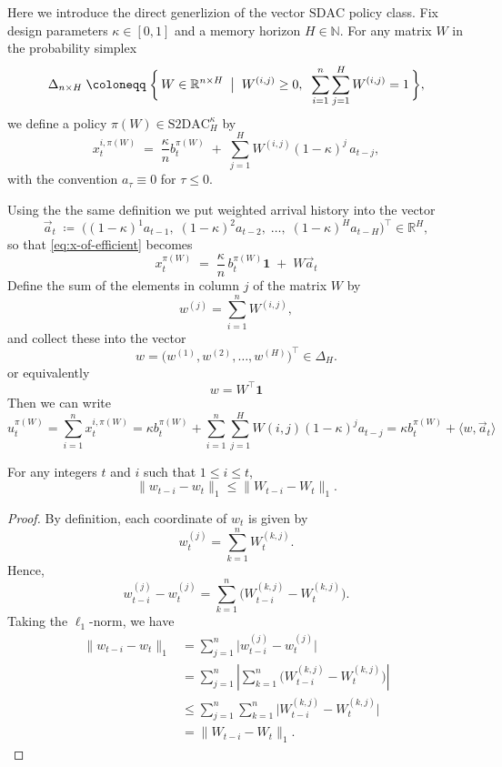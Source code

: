 Here we introduce the direct generlizion of the vector $\mathrm{SDAC}$ policy class.
Fix design parameters \(\kappa \in [0,1]\) and a memory horizon \(H \in \mathbb{N}\).  For any matrix \(W\)  in the probability simplex
\[
\Delta_{n \times H} \;\coloneqq\;
\biggl\{\,W\in\mathbb{R}^{n\times H} \;\bigm|\; W^{(i,j)} \ge 0, \;\; \sum_{i=1}^n\sum_{j=1}^H W^{(i,j)} = 1 \,\biggr\},
\]
we define a policy \(\pi(W) \in \mathrm{S2DAC}_H^\kappa\) by
\begin{equation}\label{eq:x-of-efficient}
x_t^{i,\pi(W)} \;=\; \frac{\kappa}{n} b_t^{\pi(W)} \;+\; \sum_{j=1}^H W^{(i,j)} (1-\kappa)^j \, a_{t-j},
\end{equation}
with the convention \(a_\tau \equiv 0\) for \(\tau \le 0\).

Using the the same definition we put  weighted arrival history into the vector
\[
\vec{a}_t
\;\coloneqq\;
\bigl((1-\kappa)^1 a_{t-1},\; (1-\kappa)^2 a_{t-2},\;\dots,\; (1-\kappa)^H a_{t-H}\bigr)^\top
\in \mathbb{R}^H ,
\]
so that \eqref{eq:x-of-efficient} becomes
\begin{equation}
    \label{eq:x-vec-1}
    x_t^{\pi(W)} \;=\; \frac{\kappa}{n}\, b_t^{\pi(W)} \mathbf{1} \;+\; W \vec{a}_t
\end{equation}
Define the sum of the elements in column \(j\) of the matrix \(W\) by
\[
w^{(j)}
=
\sum_{i=1}^n W^{(i,j)},
\]
and collect these into the vector
\[
w = \big( w^{(1)}, w^{(2)}, \ldots, w^{(H)} \big)^\top \in \Delta_H.
\]
or equivalently
\[
w = 
W^\top \mathbf{1}
\]
Then we can write 
\[
u_t^{\pi(W)}
=
\sum_{i=1}^n x_t^{i,\pi(W)}
=
\kappa b_t^{\pi(W)}
+
\sum_{i=1}^n \sum_{j=1}^H  W(i,j) (1-\kappa)^j a_{t-j}
=
\kappa b_t^{\pi(W)}
+
\langle w,\vec{a}_t\rangle
\]





\begin{Thm:Lemma}\label{lem:w-l1-W}
For any integers \( t \) and \( i \) such that \( 1 \leq i \leq t \),
\[
\|w_{t-i} - w_t\|_1 \leq \|W_{t-i} - W_t\|_1.
\]
\end{Thm:Lemma}

\begin{proof}
By definition, each coordinate of \(w_t\) is given by
\[
w_t^{(j)} = \sum_{k=1}^n W_t^{(k,j)}.
\]
Hence,
\[
w_{t-i}^{(j)} - w_t^{(j)} = \sum_{k=1}^n \big( W_{t-i}^{(k,j)} - W_t^{(k,j)} \big).
\]
Taking the \(\ell_1\)-norm, we have
\begin{align*}
\|w_{t-i}-w_t\|_1
&= \sum_{j=1}^n \big| w_{t-i}^{(j)} - w_t^{(j)} \big| \\
&= \sum_{j=1}^n \left| \sum_{k=1}^n \big( W_{t-i}^{(k,j)} - W_t^{(k,j)} \big) \right| \\
&\leq \sum_{j=1}^n \sum_{k=1}^n \big| W_{t-i}^{(k,j)} - W_t^{(k,j)} \big| \\
&= \|W_{t-i} - W_t\|_1.
\end{align*}
\end{proof}



